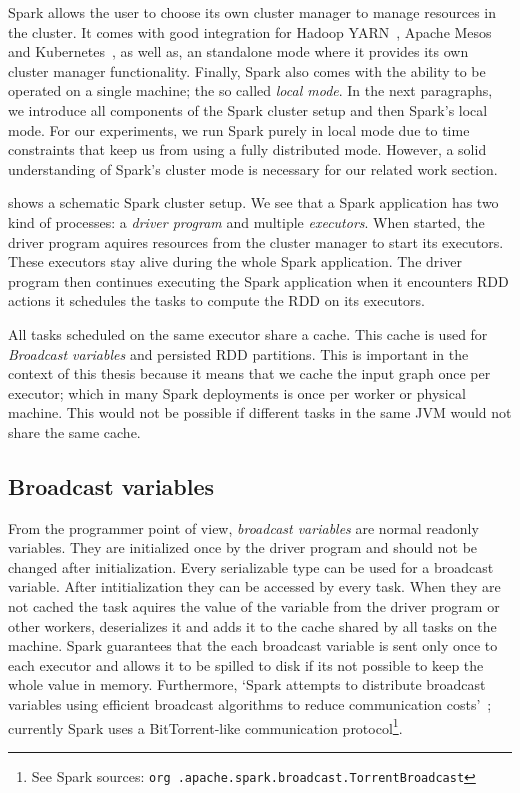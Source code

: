 Spark allows the user to choose its own cluster manager to manage resources in the cluster.
It comes with good integration for Hadoop YARN~\cite{yarn}, Apache Mesos~\cite{mesos} and Kubernetes~\cite{kubernetes}, as well as,
an standalone mode where it provides its own cluster manager functionality.
Finally, Spark also comes with the ability to be operated on a single machine; the so called \textit{local mode}.
In the next paragraphs, we introduce all components of the Spark cluster setup and then Spark's local mode.
For our experiments, we run Spark purely in local mode due to time constraints that keep us from using a fully distributed mode.
However, a solid understanding of Spark's cluster mode is necessary for our related work section.

 shows a schematic Spark cluster setup.
We see that a Spark application has two kind of processes: a \textit{driver program} and multiple \textit{executors}.
When started, the driver program aquires resources from the cluster manager to start its executors.
These executors stay alive during the whole Spark application.
The driver program then continues executing the Spark application when it encounters RDD actions it schedules the
tasks to compute the RDD on its executors.

All tasks scheduled on the same executor share a cache.
This cache is used for \textit{Broadcast variables} and persisted RDD partitions.
This is important in the context of this thesis because it means that we cache the input graph once per executor;
which in many Spark deployments is once per worker or physical machine.
This would not be possible if different tasks in the same JVM would not share the same cache.

\subsection{Broadcast variables}
From the programmer point of view, \textit{broadcast variables} are normal readonly variables.
They are initialized once by the driver program and should not be changed after initialization.
Every serializable type can be used for a broadcast variable.
After intitialization they can be accessed by every task.
When they are not cached the task aquires the value of the variable from the driver program or other workers, deserializes it and
adds it to the cache shared by all tasks on the machine.
Spark guarantees that the each broadcast variable is sent only once to each executor and allows it to be spilled to disk if its not
possible to keep the whole value in memory.
Furthermore, `Spark attempts to distribute broadcast variables using efficient broadcast algorithms to reduce communication
costs'~\cite{rdd-programming-guide}; currently Spark uses a BitTorrent-like communication protocol\footnote{See Spark sources: \texttt{org
.apache.spark.broadcast.TorrentBroadcast}}.


